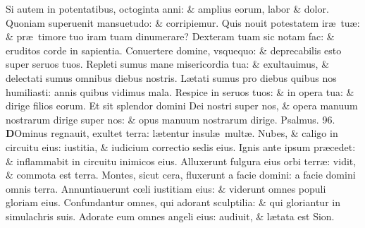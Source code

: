 \documentclass[a5paper,10pt]{book}
\def\ae{æ}
\def\oe{œ}
\begin{document}
\begin{multicols*}{2}
\newline \color{red} S\color{black}i autem in potentatibus, octoginta anni: \& amplius eorum, labor \& dolor.
\newline \color{red} Q\color{black}uoniam superuenit mansuetudo: \& corripiemur.
\newline \color{red} Q\color{black}uis nouit potestatem ir\ae \ tu\ae : \& pr\ae \ timore tuo iram tuam dinumerare?
\newline \color{red} D\color{black}exteram tuam sic notam fac: \& eruditos corde in sapientia.
\newline \color{red} C\color{black}onuertere domine, vsquequo: \& deprecabilis esto super seruos tuos.
\newline \color{red} R\color{black}epleti sumus mane misericordia tua: \& exultauimus, \& delectati sumus omnibus diebus nostris.
\newline \color{red} L\color{black}\ae tati sumus pro diebus quibus nos humiliasti: annis quibus vidimus mala.
\newline \color{red} R\color{black}espice in seruos tuos: \& in opera tua: \& dirige filios eorum.
\newline \color{red} E\color{black}t sit splendor domini Dei nostri super nos, \& opera manuum nostrarum dirige super nos: \& opus manuum nostrarum dirige. \quad \color{red} Psalmus. 96. \color{black}
\vspace{-1em}
\lettrine[lines=2]{\bfseries \color{red} D}{}Ominus regnauit, exultet terra: l\ae tentur insul\ae \ mult\ae .
\newline \color{red} N\color{black}ubes, \& caligo in circuitu eius: iustitia, \& iudicium correctio sedis eius.
\newline \color{red} I\color{black}gnis ante ipsum pr\ae cedet: \& inflammabit in circuitu inimicos eius.
\newline \color{red} A\color{black}lluxerunt fulgura eius orbi terr\ae : vidit, \& commota est terra.%
\newline \color{red} M\color{black}ontes, sicut cera, fluxerunt a facie domini: a facie domini omnis terra.
\newline \color{red} A\color{black}nnuntiauerunt c\oe li iustitiam eius: \& viderunt omnes populi gloriam eius.
\newline \color{red} C\color{black}onfundantur omnes, qui adorant sculptilia: \& qui gloriantur in simulachris suis.
\newline \color{red} A\color{black}dorate eum omnes angeli eius: audiuit, \& l\ae tata est Sion.

\end{multicols*}
\end{document}
